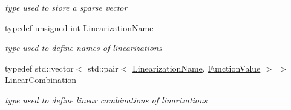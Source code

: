 \begin{Indent}
\begin{DoxyCompactItemize}
\begin{DoxyCompactList}\small\item\em type used to store a sparse vector \end{DoxyCompactList}\item 
\mbox{\label{class_s_m_spp__di__unipi__it_1_1_c05_function_ae90bf93c6d4b4ada66791c735d1c03cc}} 
typedef unsigned int \mbox{\hyperlink{class_s_m_spp__di__unipi__it_1_1_c05_function_ae90bf93c6d4b4ada66791c735d1c03cc}{Linearization\+Name}}
\begin{DoxyCompactList}\small\item\em type used to define names of linearizations \end{DoxyCompactList}\item 
\mbox{\label{class_s_m_spp__di__unipi__it_1_1_c05_function_a70544540af2063e1072dfaed40270109}} 
typedef std\+::vector$<$ std\+::pair$<$ \mbox{\hyperlink{class_s_m_spp__di__unipi__it_1_1_c05_function_ae90bf93c6d4b4ada66791c735d1c03cc}{Linearization\+Name}}, \mbox{\hyperlink{class_s_m_spp__di__unipi__it_1_1_function_a9ad432406b609e28d340f73e9474bffe}{Function\+Value}} $>$ $>$ \mbox{\hyperlink{class_s_m_spp__di__unipi__it_1_1_c05_function_a70544540af2063e1072dfaed40270109}{Linear\+Combination}}
\begin{DoxyCompactList}\small\item\em type used to define linear combinations of linarizations \end{DoxyCompactList}\end{DoxyCompactItemize}
\end{Indent}
